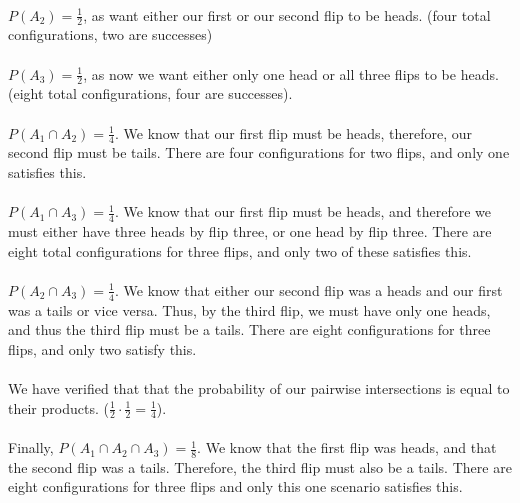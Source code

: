 \documentclass{article}
\begin{document}
\begin{enumerate}
    \paragraph{} $P(A_2) = \frac{1}{2}$, as want either our first or our second flip to be heads. (four total
    configurations, two are successes)
    \paragraph{} $P(A_3) = \frac{1}{2}$, as now we want either only one head or all three flips to be heads. (eight
    total configurations, four are successes).

    \paragraph{} $P(A_1 \cap A_2) = \frac{1}{4}$. We know that our first flip must be heads, therefore, our
    second flip must be tails. There are four configurations for two flips, and only one satisfies this.

    \paragraph{} $P(A_1 \cap A_3) = \frac{1}{4}$. We know that our first flip must be heads, and therefore
    we must either have three heads by flip three, or one head by flip three. There are eight total configurations
    for three flips, and only two of these satisfies this.

    \paragraph{} $P(A_2 \cap A_3) = \frac{1}{4}$. We know that either our second flip was a heads and our first
    was a tails or vice versa. Thus, by the third flip, we must have only one heads, and thus the third flip must be 
    a tails. There are eight configurations for three flips, and only two satisfy this.

    \paragraph{}We have verified that that the probability of our pairwise intersections is equal to their 
    products. ($\frac{1}{2} \cdot \frac{1}{2} = \frac{1}{4}$).

    \paragraph{}Finally, $P(A_1 \cap A_2 \cap A_3) = \frac{1}{8}$. We know that the first flip was heads, and that the second
    flip was a tails. Therefore, the third flip must also be a tails. There are eight configurations for three
    flips and only this one scenario satisfies this.


\end{enumerate}
\end{document}
